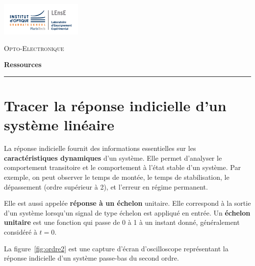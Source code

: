 \newpage
\pagestyle{empty}

\begin{minipage}[c]{.25\linewidth}
	\includegraphics[width=4cm]{images/Logo-LEnsE.png}
\end{minipage} \hfill
\begin{minipage}[c]{.4\linewidth}

\begin{center}
\vspace{0.3cm}
{\Large \textsc{Opto-Electronique}}

\medskip

\textbf{\Large Ressources}

\end{center}
\end{minipage}\hfill

\vspace{0.5cm}

\noindent \rule{\linewidth}{1pt}
\section{Tracer la réponse indicielle d'un système linéaire}
\label{ressource:RepIndic}



La réponse indicielle fournit des informations essentielles sur les \textbf{caractéristiques dynamiques} d'un système. Elle permet d'analyser le comportement transitoire et le comportement à l'état stable d'un système. Par exemple, on peut observer le temps de montée, le temps de stabilisation, le dépassement (ordre supérieur à 2), et l'erreur en régime permanent.

Elle est aussi appelée \textbf{réponse à un échelon} unitaire. Elle correspond à la sortie d'un système lorsqu'un signal de type échelon est appliqué en entrée. Un \textbf{échelon unitaire} est une fonction qui passe de 0 à 1 à un instant donné, généralement considéré à $t = 0$. 

La figure~\ref{fig:ordre2} est une capture d'écran d'oscilloscope représentant la réponse indicielle d'un système passe-bas du second ordre. 

